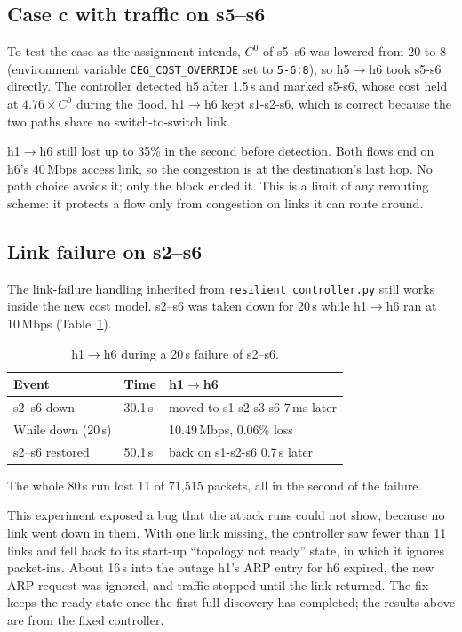 \documentclass[11pt,a4paper]{article}
\newcommand{\ra}{\ensuremath{\rightarrow}}
\newcommand{\code}[1]{\texttt{#1}}
\newcommand{\Czero}{\ensuremath{C^{0}}}
\newcommand{\tabref}[1]{Table~\ref{#1}}
\begin{document}
\subsection{Case c with traffic on s5--s6}
\label{sec:c-override}

To test the case as the assignment intends, \Czero{} of s5--s6 was lowered from 20 to 8
(environment variable \code{CEG\_COST\_OVERRIDE} set to \code{5-6:8}), so h5\ra h6 took s5-s6 directly. The controller detected h5 after 1.5\,s and
marked s5-s6, whose cost held at $4.76\times C^0$ during the flood. h1\ra h6 kept s1-s2-s6, which is correct
because the two paths share no switch-to-switch link.

h1\ra h6 still lost up to 35\% in the second before detection. Both flows end on h6's 40\,Mbps access link, so the
congestion is at the destination's last hop. No path choice avoids it; only the block ended it. This is a limit
of any rerouting scheme: it protects a flow only from congestion on links it can route around.

\subsection{Link failure on s2--s6}

The link-failure handling inherited from \code{resilient\_controller.py} still works inside the new cost model.
s2--s6 was taken down for 20\,s while h1\ra h6 ran at 10\,Mbps (\tabref{tab:linkfail}).

\begin{table}[H]
  \centering
  \small
  \caption{h1\ra h6 during a 20\,s failure of s2--s6.}
  \label{tab:linkfail}
  \begin{tabular}{lll}
    \toprule
    Event & Time & h1\ra h6 \\
    \midrule
    s2--s6 down & 30.1\,s & moved to s1-s2-s3-s6 7\,ms later \\
    While down (20\,s) & & 10.49\,Mbps, 0.06\% loss \\
    s2--s6 restored & 50.1\,s & back on s1-s2-s6 0.7\,s later \\
    \bottomrule
  \end{tabular}
\end{table}

The whole 80\,s run lost 11 of 71{,}515 packets, all in the second of the failure.

This experiment exposed a bug that the attack runs could not show, because no link went down in them. With one
link missing, the controller saw fewer than 11 links and fell back to its start-up ``topology not ready'' state,
in which it ignores packet-ins. About 16\,s into the outage h1's ARP entry for h6 expired, the new ARP request was
ignored, and traffic stopped until the link returned. The fix keeps the ready state once the first full discovery
has completed; the results above are from the fixed controller.
\end{document}
